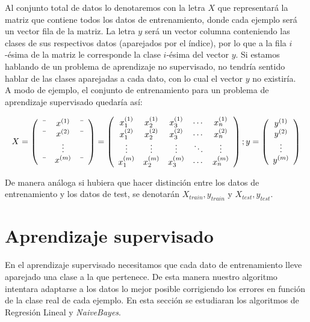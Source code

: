Al conjunto total de datos lo denotaremos con la letra $X$ que representará la matriz que contiene
todos los datos de entrenamiento, donde cada ejemplo será un vector fila de la matriz.
La letra $y$ será un vector columna conteniendo las clases de sus respectivos datos (aparejados por el índice), 
por lo que a la fila $i$-ésima de la matriz le corresponde la clase $i$-ésima del vector $y$.
Si estamos hablando de un problema de aprendizaje no supervisado, no tendría sentido hablar de las clases 
aparejadas a cada dato, con lo cual el vector $y$ no existiría.\\
A modo de ejemplo, el conjunto de entrenamiento para un problema de aprendizaje supervisado quedaría así:

$$
X = \left(\begin{array}{ccc}
    \textemdash & x^{(1)} & \textemdash \\
    \textemdash & x^{(2)} & \textemdash \\
     & \vdots &  \\
    \textemdash & x^{(m)} & \textemdash \\
\end{array}\right)
%
=
  \left(\begin{array}{ccccc}
    x^{(1)}_1 & x^{(1)}_2 & x^{(1)}_3 & \cdots & x^{(1)}_n \\
    x^{(2)}_1 & x^{(2)}_2 & x^{(2)}_3 & \cdots & x^{(2)}_n \\
    \vdots & \vdots & \vdots & \ddots & \vdots \\
    x^{(m)}_1 & x^{(m)}_2 & x^{(m)}_3 & \cdots & x^{(m)}_n \\
\end{array}\right)
%
;
y = \left(\begin{array}{c}
    y^{(1)} \\
    y^{(2)} \\
    \vdots \\
    y^{(m)} \\
\end{array}\right)
$$

De manera análoga si hubiera que hacer distinción entre los datos de entrenamiento y los datos de test, 
se denotarán $X_{train}, y_{train}$ y $X_{test}, y_{test}$.


\section{Aprendizaje supervisado}
En el aprendizaje supervisado necesitamos que cada dato de entrenamiento lleve aparejado una clase 
a la que pertenece. De esta manera nuestro algoritmo intentara adaptarse a los datos lo mejor 
posible corrigiendo los errores en función de la clase real de cada ejemplo.
En esta sección se estudiaran los algoritmos de Regresión Lineal y \textit{NaiveBayes}.



